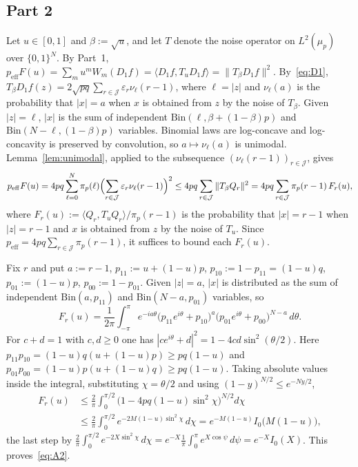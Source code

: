\documentclass[11pt]{amsart}
\theoremstyle{remark}
\newcommand{\peff}{p_{\mathrm{eff}}}
\newcommand{\J}{\mathcal{J}}
\begin{document}
\subsection{Part 2}
Let $u \in [0,1]$ and $\beta := \sqrt{u}$, and let $T$ denote the noise operator on $L^2(\mu_p)$ over $\{0,1\}^N$. By Part~1, $\peff F(u) = \sum_m u^m W_m(D_1 f) = \langle D_1 f, T_u D_1 f\rangle = \|T_\beta D_1 f\|^2$. By~\eqref{eq:D1}, $T_\beta D_1 f(z) = 2\sqrt{pq}\sum_{r \in \J} \varepsilon_r \nu_\ell(r-1)$, where $\ell = |z|$ and $\nu_\ell(a)$ is the probability that $|x| = a$ when $x$ is obtained from $z$ by the noise of $T_\beta$. Given $|z| = \ell$, $|x|$ is the sum of independent $\mathrm{Bin}(\ell, \beta + (1-\beta)p)$ and $\mathrm{Bin}(N - \ell, (1-\beta)p)$ variables. Binomial laws are log-concave and log-concavity is preserved by convolution, so $a \mapsto \nu_\ell(a)$ is unimodal. Lemma~\ref{lem:unimodal}, applied to the subsequence $(\nu_\ell(r-1))_{r \in \J}$, gives
\[
\peff F(u) = 4pq \sum_{\ell=0}^N \pi_p(\ell) \Bigl(\sum_{r \in \J} \varepsilon_r \nu_\ell(r-1)\Bigr)^2 \le 4pq \sum_{r \in \J} \|T_\beta Q_r\|^2 = 4pq \sum_{r \in \J} \pi_p(r-1)\, F_r(u),
\]
where $F_r(u) := \langle Q_r, T_u Q_r\rangle / \pi_p(r-1)$ is the probability that $|x| = r-1$ when $|z| = r - 1$ and $x$ is obtained from $z$ by the noise of $T_u$. Since $\peff = 4pq\sum_{r \in \J}\pi_p(r-1)$, it suffices to bound each $F_r(u)$.

Fix $r$ and put $a := r - 1$, $p_{11} := u + (1-u)p$, $p_{10} := 1 - p_{11} = (1-u)q$, $p_{01} := (1-u)p$, $p_{00} := 1 - p_{01}$. Given $|z| = a$, $|x|$ is distributed as the sum of independent $\mathrm{Bin}(a, p_{11})$ and $\mathrm{Bin}(N - a, p_{01})$ variables, so
\[
F_r(u) = \frac{1}{2\pi}\int_{-\pi}^{\pi} e^{-ia\theta} \bigl(p_{11}e^{i\theta} + p_{10}\bigr)^{a} \bigl(p_{01}e^{i\theta} + p_{00}\bigr)^{N-a}\, d\theta .
\]
For $c + d = 1$ with $c, d \ge 0$ one has $|c e^{i\theta} + d|^2 = 1 - 4cd \sin^2(\theta/2)$. Here $p_{11}p_{10} = (1-u)q(u + (1-u)p) \ge pq(1-u)$ and $p_{01}p_{00} = (1-u)p(u + (1-u)q) \ge pq(1-u)$. Taking absolute values inside the integral, substituting $\chi = \theta/2$ and using $(1 - y)^{N/2} \le e^{-Ny/2}$,
\begin{align*}
F_r(u) &\le \frac{2}{\pi}\int_0^{\pi/2} \bigl(1 - 4pq(1-u)\sin^2\chi\bigr)^{N/2} d\chi\\
&\le \frac{2}{\pi}\int_0^{\pi/2} e^{-2M(1-u)\sin^2\chi}\, d\chi = e^{-M(1-u)} I_0\bigl(M(1-u)\bigr),
\end{align*}
the last step by $\frac{2}{\pi}\int_0^{\pi/2} e^{-2X\sin^2\chi}\,d\chi = e^{-X}\frac{1}{\pi}\int_0^\pi e^{X\cos\psi}\, d\psi = e^{-X} I_0(X)$. This proves~\eqref{eq:A2}.
\end{document}
